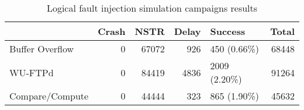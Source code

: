 \begin{table}[t]
\centering
\caption{Logical fault injection simulation campaigns results}
\label{table:end_sim_by_status_wop_multi_bitflip_reg_multi}
\begin{tabular}{lrrrlr}
\toprule
 & Crash & NSTR & Delay & Success & Total \\
\midrule
Buffer Overflow & 0 & 67072 & 926 & 450 (0.66\%) & 68448 \\
WU-FTPd & 0 & 84419 & 4836 & 2009 (2.20\%) & 91264 \\
Compare/Compute & 0 & 44444 & 323 & 865 (1.90\%) & 45632 \\
\bottomrule
\end{tabular}
\end{table}
